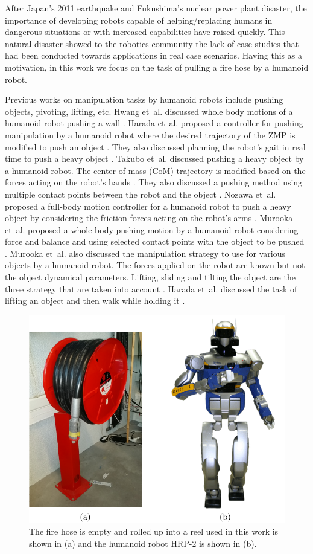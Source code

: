 %
After Japan's 2011 earthquake and Fukushima's nuclear power plant disaster, the importance of developing robots capable of helping/replacing humans in dangerous situations or with increased capabilities have raised quickly.
%
This natural disaster showed to the robotics community the lack of case studies that had been conducted towards applications in real case scenarios.
%
Having this as a motivation, in this work we focus on the task of pulling a fire hose by a humanoid robot.
%

Previous works on manipulation tasks by humanoid robots include pushing objects, pivoting, lifting, etc.
%
Hwang et~al. discussed whole body motions of a humanoid robot pushing a wall \cite{pushWall}.
%
Harada et~al. proposed a controller for pushing manipulation by a humanoid robot where the desired trajectory of the ZMP is modified to push an object \cite{pushingZMP}.
%
They also discussed planning the robot's gait in real time to push a heavy object \cite{pushRealTime}.
%
Takubo et~al. discussed pushing a heavy object by a humanoid robot.
The center of mass (CoM) trajectory is modified based on the forces acting on the robot's hands \cite{pushingChair}.
They also discussed a pushing method using multiple contact points between the robot and the object \cite{pushingChair2}.
%
Nozawa et~al. proposed a full-body motion controller for a humanoid robot to push a heavy object by considering the friction forces acting on the robot's arms \cite{pushingForceControl}.
%
Murooka et~al. proposed a whole-body pushing motion by a humanoid robot considering force and balance and using selected contact points with the object to be pushed \cite{pushDesk}.
%
%
Murooka et~al. also discussed the manipulation strategy to use for various objects by a humanoid robot.
The forces applied on the robot are known but not the object dynamical parameters.
Lifting, sliding and tilting the object are the three strategy that are taken into account \cite{Murooka:icra:2014}.
%
Harada et~al. discussed the task of lifting an object and then walk while holding it \cite{heavyObject}.
%

%
\begin{figure}[t]
 \centering
 \includegraphics[height=0.40\textwidth]{./figures/Hose_HRP2.pdf}
 \vspace{-3mm}
 \caption{The fire hose is empty and rolled up into a reel used in this work is shown in (a) and the humanoid robot HRP-$2$ is shown in (b).}
 \label{rob_hose}
\end{figure}


